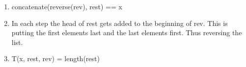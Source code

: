 \documentclass[a4paper]{article}
\begin{document}
	\noindent
	\begin{enumerate}
		\item concatenate(reverse(rev), rest) == x\\
		\item In each step the head of rest gets added to the beginning of rev. This is putting the first elements last and the last elements first. Thus reversing the list.\\
		\item T(x, rest, rev) = length(rest)\\
	\end{enumerate}
\end{document}
